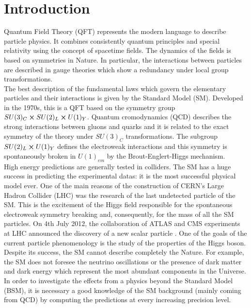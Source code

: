 \chapter{Introduction}
Quantum Field Theory (QFT) represents the modern language to describe particle physics. It combines consistently quantum principles and special relativity using the concept of spacetime fields. The dynamics of the fields is based on symmetries in Nature. In particular, the interactions between particles are described in gauge theories which show a redundancy under local group transformations.\\

The best description of the fundamental laws which govern the elementary particles and their interactions is given by the Standard Model (SM). Developed in the 1970s, this is a QFT based on the symmetry group $SU(3)_C\cross SU(2)_L \cross U(1)_Y$. Quantum cromodynamics (QCD) describes the strong interactions between gluons and quarks and it is related to the exact symmetry of the theory under $SU(3)_C$ transformations. The subgroup $SU(2)_L \cross U(1)_Y$ defines the electroweak interactions and this symmetry is spontaneously broken in $U(1)_{em}$ by the Brout-Englert-Higgs mechanism.\\

High energy predictions are generally tested in colliders. The SM has a huge success in predicting the experimental datas: it is the most successful physical model ever. One of the main reasons of the construction of CERN's Large Hadron Collider (LHC) was the research of the last undetected particle of the SM. This is the excitement of the Higgs field responsible for the spontaneous electroweak symmetry breaking and, consequently, for the mass of all the SM particles. On 4th July 2012, the collaboration of ATLAS and CMS experiments at LHC announced the discovery of a new scalar particle \cite{ATLAS:2012yve, CMS:2012qbp}. One of the goals of the current particle phenomenology is the study of the properties of the Higgs boson.\\
Despite its success, the SM cannot describe completely the Nature. For example, the SM does not foresee the neutrino oscillations or the presence of dark matter and dark energy which represent the most abundant components in the Universe.\\
In order to investigate the effects from a physics beyond the Standard Model (BSM), it is necessary a good knowledge of the SM background (mainly coming from QCD) by computing the predictions at every increasing precision level.\\


